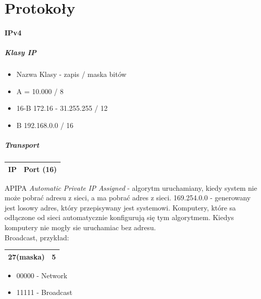 \part{Protokoły}
\subsection{IPv4}

\subsubsection{Klasy IP}
\begin{itemize}
	\item Nazwa Klasy - zapis / maska bitów 
	\item A = 10.000 / 8
	\item 16-B 172.16 - 31.255.255 / 12
	\item B 192.168.0.0 / 16
\end{itemize}
\subsubsection{Transport}
\begin{table}[h]
	\begin{tabular}{|c|c|}
		\hline
		IP	&	Port (16)	\\ \hline
	\end{tabular}
\end{table}
APIPA \emph{Automatic Private IP Assigned} - algorytm uruchamiany, kiedy system nie może pobrać adresu z sieci, a ma pobrać adres z sieci.
169.254.0.0 - generowany jest losowy adres, który przepisywany jest systemowi. Komputery, które sa odłączone od sieci automatycznie konfigurują się tym algorytmem. Kiedys komputery nie mogły sie uruchamiac bez adresu.\\
Broadcast, przykład:
\begin{table}[h]
	\begin{tabular}{|c|c|}
		\hline
		27(maska) &	5	\\ \hline
	\end{tabular}
\end{table}
\begin{itemize}
	\item 00000 - Network
	\item 11111 - Broadcast
\end{itemize}



